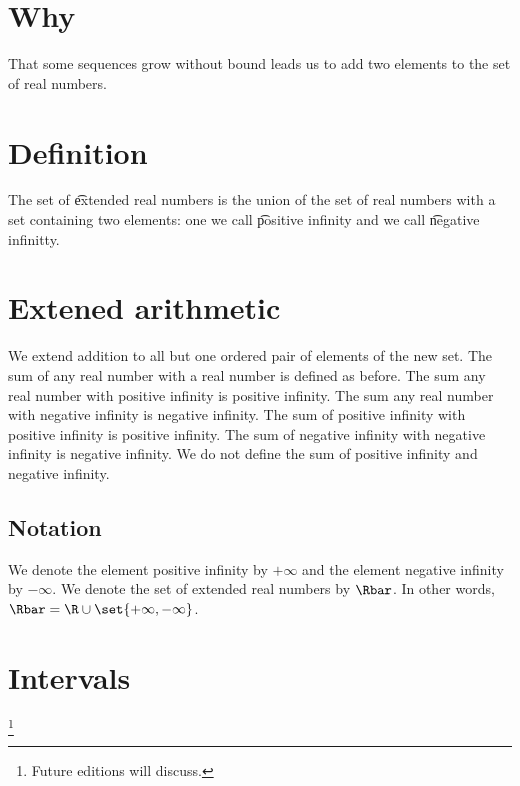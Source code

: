 

\section*{Why}

That some sequences grow without bound leads us to add two elements to the set of real numbers.

\section*{Definition}

The set of \t{extended real numbers} is the union of the set of real numbers with a set containing two elements: one we call \t{positive infinity} and we call \t{negative infinitty}.

\section*{Extened arithmetic}

We extend addition to all
but one ordered pair of elements
of the new set.
The sum of any real number with
a real number is defined as before.
The sum any real number with positive
infinity is positive infinity.
The sum any real number with negative
infinity is negative infinity.
The sum of positive infinity with
positive infinity is positive infinity.
The sum of negative infinity with
negative infinity is negative infinity.
We do not define the sum of
positive infinity and negative infinity.

\subsection*{Notation}

We denote the element positive infinity by $+\infty$ and the element negative infinity by $-\infty$.
We denote the set of extended real numbers by $\Rbar$.
In other words, $\Rbar = \R  \cup \set{+\infty,-\infty}$.

\section*{Intervals}
\footnote{Future editions will discuss.}
\blankpage